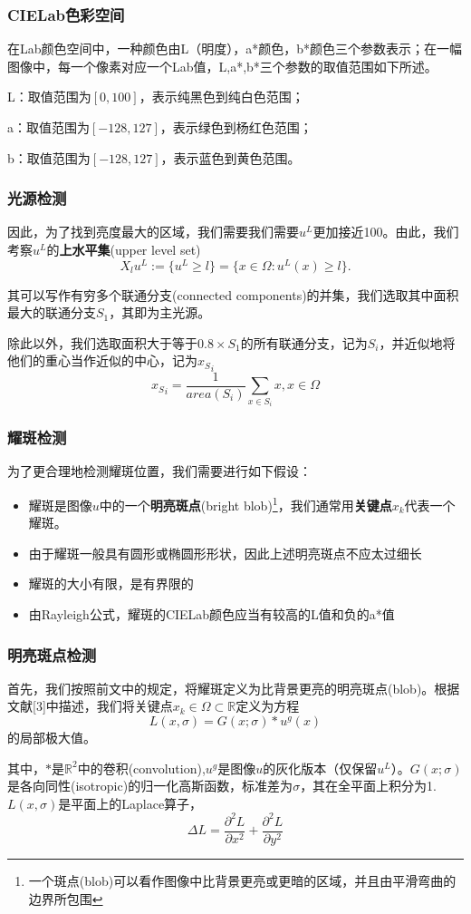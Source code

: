 \documentclass{beamer}
\begin{document}
\begin{frame}
\frametitle{CIELab色彩空间}
在Lab颜色空间中，一种颜色由L（明度），a*颜色，b*颜色三个参数表示；在一幅图像中，每一个像素对应一个Lab值，L,a*,b*三个参数的取值范围如下所述。\pause


L：取值范围为$[0, 100]$，表示纯黑色到纯白色范围；

a：取值范围为$[-128, 127]$，表示绿色到杨红色范围；

b：取值范围为$[-128, 127]$，表示蓝色到黄色范围。

\end{frame}
\begin{frame}
\frametitle{光源检测}
因此，为了找到亮度最大的区域，我们需要我们需要$u^L$更加接近100。由此，我们考察$u^L$的\textbf{上水平集}(upper level set)
\begin{equation}
X_lu^L:=\{u^L\geq l\}=\{x\in \Omega:u^L(x)\geq l\}.
\end{equation}\pause

其可以写作有穷多个联通分支(connected components)的并集，我们选取其中面积最大的联通分支$S_1$，其即为主光源。\pause


除此以外，我们选取面积大于等于$0.8\times S_1$的所有联通分支，记为$S_i$，并近似地将他们的重心当作近似的中心，记为${x_S}_i$
\begin{equation}
{x_S}_i=\frac{1}{area(S_i)}\sum_{x\in S_i}x,x\in \Omega
\end{equation}
\end{frame}
\begin{frame}
\frametitle{耀斑检测}
 为了更合理地检测耀斑位置，我们需要进行如下假设：
 \begin{itemize}
 \item 耀斑是图像$u$中的一个\textbf{明亮斑点}(bright blob)\footnote{一个斑点(blob)可以看作图像中比背景更亮或更暗的区域，并且由平滑弯曲的边界所包围}，我们通常用\textbf{关键点}$x_k$代表一个耀斑。\pause
 \item 由于耀斑一般具有圆形或椭圆形形状，因此上述明亮斑点不应太过细长\pause
 \item 耀斑的大小有限，是有界限的\pause
 \item 由Rayleigh公式，耀斑的CIELab颜色应当有较高的L值和负的a*值\pause
 
 \end{itemize}
\end{frame}
\begin{frame}
\frametitle{明亮斑点检测}
首先，我们按照前文中的规定，将耀斑定义为比背景更亮的明亮斑点(blob)。根据文献[3]中描述，我们将关键点$x_k\in \Omega \subset \mathbb{R}$定义为方程
\begin{equation}
L(x,\sigma)=G(x;\sigma)\ast u^g(x)
\end{equation}
的局部极大值。\pause

其中，$\ast $是$\mathbb{R}^2$中的卷积(convolution),$u^g$是图像$u$的灰化版本（仅保留$u^L$）。$G(x;\sigma)$是各向同性(isotropic)的归一化高斯函数，标准差为$\sigma$，其在全平面上积分为1.$L(x,\sigma)$是平面上的Laplace算子，
\begin{equation}
\Delta L=\frac{\partial^2 L}{\partial x^2}+\frac{\partial^2 L}{\partial y^2}
\end{equation}
\end{frame}
\end{document}
